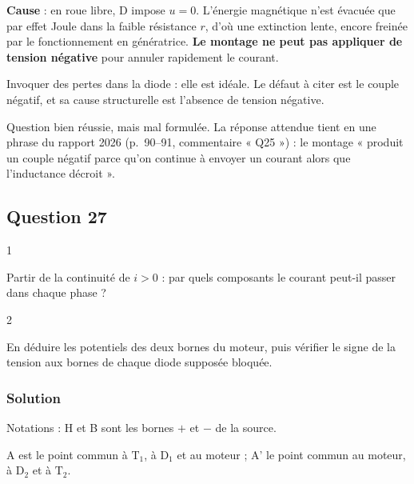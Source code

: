 \documentclass[11pt,a4paper]{article}
\begin{document}
\textbf{Cause} : en roue libre, D impose \(u=0\). L'énergie magnétique n'est évacuée que par effet Joule dans la faible résistance \(r\), d'où une extinction lente, encore freinée par le fonctionnement en génératrice. \textbf{Le montage ne peut pas appliquer de tension négative} pour annuler rapidement le courant.

\begin{piege}

Invoquer des pertes dans la diode : elle est idéale. Le défaut à citer est le couple négatif, et sa cause structurelle est l'absence de tension négative.

\end{piege}

\begin{jury}

Question bien réussie, mais mal formulée. La réponse attendue tient en une phrase du rapport 2026 (p.~90--91, commentaire « Q25 ») : le montage « produit un couple négatif parce qu'on continue à envoyer un courant alors que l'inductance décroit ».

\end{jury}

\hypertarget{question-27}{%
\subsection{Question 27}\label{question-27}}

\begin{indication}{1}

Partir de la continuité de \(i>0\) : par quels composants le courant peut-il passer dans chaque phase ?

\end{indication}

\begin{indication}{2}

En déduire les potentiels des deux bornes du moteur, puis vérifier le signe de la tension aux bornes de chaque diode supposée bloquée.

\end{indication}

\hypertarget{solution-26}{%
\subsubsection{Solution}\label{solution-26}}

Notations : H et B sont les bornes \(+\) et \(-\) de la source.

A est le point commun à \(\mathrm T_1\), à \(\mathrm D_1\) et au moteur ; A' le point commun au moteur, à \(\mathrm D_2\) et à \(\mathrm T_2\).
\end{document}
